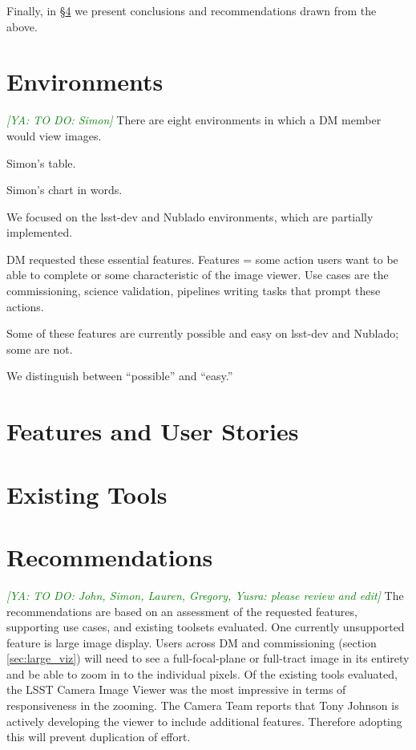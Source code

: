 \documentclass[DM,authoryear,toc]{lsstdoc}
\newcommand{\yusra}[1]{{\it \textcolor{green}{[YA: #1]}}}
\begin{document}
Finally, in \S\ref{sec:conc} we present conclusions and recommendations drawn from the above.

\section{Environments}
\label{sec:env}
\yusra{TO DO: Simon}
There are eight environments in which a DM member would view images.

Simon's table.

Simon's chart in words.

We focused on the lsst-dev and Nublado environments, which are partially implemented.

DM requested these essential features.
Features = some action users want to be able to complete or some characteristic of the image viewer.
Use cases are the commissioning,  science validation, pipelines writing tasks that prompt these actions.

Some of these features are currently possible and easy on lsst-dev and Nublado; some are not.

We distinguish between ``possible'' and ``easy.''

\section{Features and User Stories}
\label{sec:features}


\section{Existing Tools}
\label{sec:tools}


\section{Recommendations}
\label{sec:conc}

\yusra{TO DO: John, Simon, Lauren, Gregory, Yusra: please review and edit}
The recommendations are based on an assessment of the requested features, supporting use cases, and existing toolsets evaluated.
One currently unsupported feature is large image display.
Users across DM and commissioning (section \ref{sec:large_viz}) will need to see a full-focal-plane or full-tract image in its entirety and be able to zoom in to the individual pixels.
Of the existing tools evaluated, the LSST Camera Image Viewer was the most impressive in terms of responsiveness in the zooming.
The Camera Team reports that Tony Johnson is actively developing the viewer to include additional features.
Therefore adopting this will prevent duplication of effort.
\end{document}
